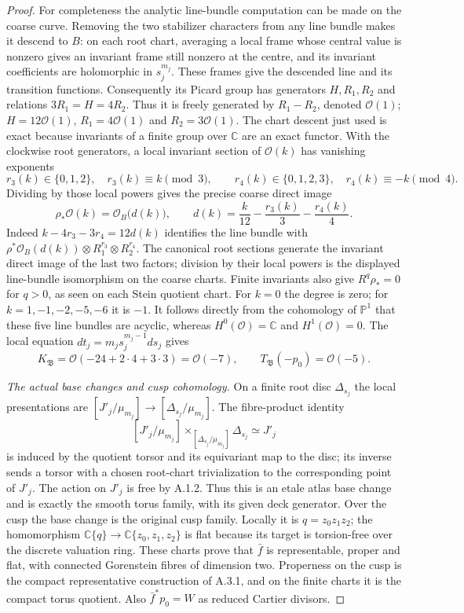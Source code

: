 \begin{proof}
For completeness the analytic line-bundle computation can be made on
the coarse curve. Removing the two stabilizer characters from any line
bundle makes it descend to $B$: on each root chart, averaging a local
frame whose central value is nonzero gives an invariant frame still
nonzero at the centre, and its invariant coefficients are holomorphic
in $s_j^{m_j}$. These frames give the descended line and its transition
functions. Consequently its Picard group has
generators $H,R_1,R_2$ and relations $3R_1=H=4R_2$.
Thus it is freely generated by $R_1-R_2$, denoted $\mathcal O(1)$;
$H=12\mathcal O(1)$, $R_1=4\mathcal O(1)$ and
$R_2=3\mathcal O(1)$. The chart descent just used is exact because
invariants of a finite group over $\mathbb C$ are an exact functor.
With the clockwise root generators, a local invariant section of
$\mathcal O(k)$ has vanishing exponents
\[
 r_3(k)\in\{0,1,2\},\quad r_3(k)\equiv k\pmod3,
 \qquad
 r_4(k)\in\{0,1,2,3\},\quad r_4(k)\equiv-k\pmod4.
\]
Dividing by those local powers gives the precise coarse direct image
\begin{equation}\label{eq:ab-root-degree}
 \rho_*\mathcal O(k)=\mathcal O_B\bigl(d(k)\bigr),\qquad
 d(k)=\frac{k}{12}-\frac{r_3(k)}3-\frac{r_4(k)}4.
\end{equation}
Indeed $k-4r_3-3r_4=12d(k)$ identifies the line bundle with
$\rho^*\mathcal O_B(d(k))\otimes R_1^{r_3}\otimes R_2^{r_4}$.
The canonical root sections generate the invariant direct image of
the last two factors; division by their local powers is the displayed
line-bundle isomorphism on the coarse charts. Finite invariants also give
$R^q\rho_*=0$ for $q>0$, as seen on each Stein quotient chart.
For $k=0$ the degree is zero; for
$k=1,-1,-2,-5,-6$ it is $-1$. It follows directly from the
cohomology of $\mathbb P^1$ that these five line bundles are acyclic,
whereas $H^0(\mathcal O)=\mathbb C$ and $H^1(\mathcal O)=0$.
The local equation $dt_j=m_js_j^{m_j-1}ds_j$ gives
\[
 K_{\mathfrak B}=\mathcal O(-24+2\cdot4+3\cdot3)
 =\mathcal O(-7),\qquad
 T_{\mathfrak B}(-p_0)=\mathcal O(-5).
\]

\emph{The actual base changes and cusp cohomology.}
On a finite root disc $\Delta_{s_j}$ the local presentations are
$[J'_j/\mu_{m_j}]\to[\Delta_{s_j}/\mu_{m_j}]$.
The fibre-product identity
\[
 [J'_j/\mu_{m_j}]
 \mathbin{\times_{[\Delta_{s_j}/\mu_{m_j}]}}\Delta_{s_j}
 \simeq J'_j
\]
is induced by the quotient torsor and its equivariant map to the disc;
its inverse sends a torsor with a chosen root-chart trivialization to
the corresponding point of $J'_j$. The action on $J'_j$ is free by
A.1.2. Thus this is an etale atlas base change and is exactly the
smooth torus family, with its given deck generator. Over the cusp the
base change is the original cusp family. Locally it is
$q=z_0z_1z_2$; the homomorphism
$\mathbb C\{q\}\to\mathbb C\{z_0,z_1,z_2\}$ is flat because its
target is torsion-free over the discrete valuation ring.
These charts prove that $\bar f$ is representable, proper and flat,
with connected Gorenstein fibres of dimension two. Properness on the
cusp is the compact representative construction of A.3.1, and on the
finite charts it is the compact torus quotient. Also
$\bar f^*p_0=W$ as reduced Cartier divisors.


\end{proof}
